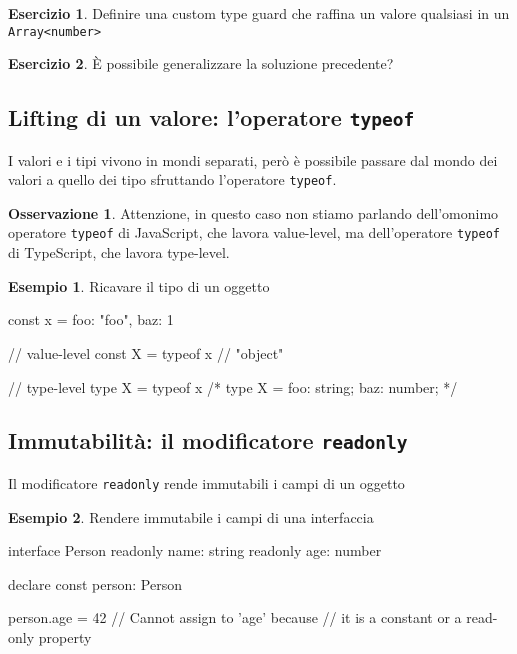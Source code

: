\documentclass[12pt]{article}
\theoremstyle{definition}
\newtheorem{example}{Esempio}[subsection]
\newtheorem{exercise}{Esercizio}[subsection]
\newtheorem{observation}{Osservazione}[subsection]
\newenvironment{code}
  {\vspace{0.5cm} \VerbatimEnvironment\begin{typescriptcode}}
  {\end{typescriptcode} \vspace{0.2cm}}
\begin{document}
\begin{exercise}
Definire una custom type guard che raffina un valore qualsiasi in un \texttt{Array<number>}
\end{exercise}

\begin{exercise}
È possibile generalizzare la soluzione precedente?
\end{exercise}

\subsection{Lifting di un valore: l'operatore \texttt{typeof}}

I valori e i tipi vivono in mondi separati, però è possibile passare dal mondo dei valori a quello dei tipo
sfruttando l'operatore \texttt{typeof}.

\begin{observation}
Attenzione, in questo caso non stiamo parlando dell'omonimo operatore \texttt{typeof} di JavaScript, che lavora value-level, ma
dell'operatore \texttt{typeof} di TypeScript, che lavora type-level.
\end{observation}

\begin{example}
Ricavare il tipo di un oggetto

\begin{code}
const x = {
  foo: "foo",
  baz: 1
}

// value-level
const X = typeof x
// "object"

// type-level
type X = typeof x
/*
type X = {
  foo: string;
  baz: number;
}
*/
\end{code}
\end{example}

\subsection{Immutabilità: il modificatore \texttt{readonly}}

Il modificatore \texttt{readonly} rende immutabili i campi di un oggetto

\begin{example}
Rendere immutabile i campi di una interfaccia

\begin{code}
interface Person {
  readonly name: string
  readonly age: number
}

declare const person: Person

person.age = 42 // Cannot assign to 'age' because
// it is a constant or a read-only property
\end{code}
\end{example}
\end{document}
